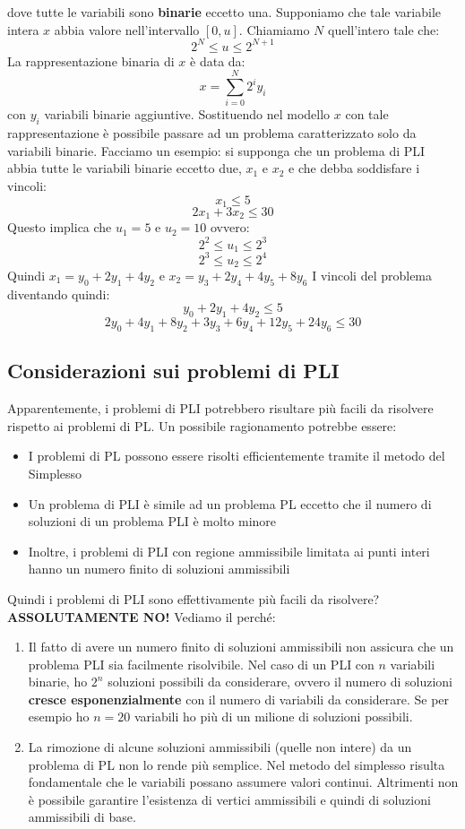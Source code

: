 \documentclass[12pt]{article}
\begin{document}
\begin{itemize}
    dove tutte le variabili sono \textbf{binarie} eccetto una. Supponiamo che tale variabile intera $x$ abbia valore nell'intervallo $[0,u]$. Chiamiamo $N$ quell'intero tale che:
    $$2^N \leq u \leq 2^{N+1}$$
    La rappresentazione binaria di $x$ è data da:
    $$x = \sum_{i = 0}^{N} 2^i y_i$$
    con $y_i$ variabili binarie aggiuntive.
    Sostituendo nel modello $x$ con tale rappresentazione è possibile passare ad un problema caratterizzato solo da variabili binarie.
    Facciamo un esempio: si supponga che un problema di PLI abbia tutte le variabili binarie eccetto due, $x_1$ e $x_2$ e che debba soddisfare i vincoli:
    $$x_1 \leq 5$$
    $$2x_1 + 3x_2 \leq 30$$
    Questo implica che $u_1 = 5$ e $u_2 = 10$ ovvero:
    $$2^2 \leq u_1 \leq 2^3$$
    $$2^3 \leq u_2 \leq 2^4$$
    Quindi
    $x_1 = y_0 + 2y_1 + 4y_2$ e $x_2 = y_3 + 2y_4 + 4y_5 + 8y_6$
    I vincoli del problema diventando quindi:
    $$y_0 + 2y_1 + 4y_2 \leq 5$$
    $$2y_0 + 4y_1 + 8y_2 + 3y_3 + 6y_4 + 12y_5 + 24y_6 \leq 30$$
\end{itemize}
\subsection{Considerazioni sui problemi di PLI}
Apparentemente, i problemi di PLI potrebbero risultare più facili da risolvere rispetto ai problemi di PL.
Un possibile ragionamento potrebbe essere:
\begin{itemize}
    \item I problemi di PL possono essere risolti efficientemente tramite il metodo del Simplesso
    \item Un problema di PLI è simile ad un problema PL eccetto che il numero di soluzioni di un problema PLI è molto minore
    \item Inoltre, i problemi di PLI con regione ammissibile limitata ai punti interi hanno un numero finito di soluzioni ammissibili
\end{itemize}
Quindi i problemi di PLI sono effettivamente più facili da risolvere? \textbf{ASSOLUTAMENTE NO!} Vediamo il perché:
\begin{enumerate}
    \item Il fatto di avere un numero finito di soluzioni ammissibili non assicura che un problema PLI sia facilmente risolvibile.
    Nel caso di un PLI con $n$ variabili binarie, ho $2^n$ soluzioni possibili da considerare, ovvero il numero di soluzioni \textbf{cresce esponenzialmente} con il numero di variabili da considerare.
    Se per esempio ho $n = 20$ variabili ho più di un milione di soluzioni possibili.
    \item La rimozione di alcune soluzioni ammissibili (quelle non intere) da un problema di PL non lo rende più semplice. Nel metodo del simplesso risulta fondamentale che le variabili possano assumere valori continui.
    Altrimenti non è possibile garantire l'esistenza di vertici ammissibili e quindi di soluzioni ammissibili di base.
\end{enumerate}
\end{document}
